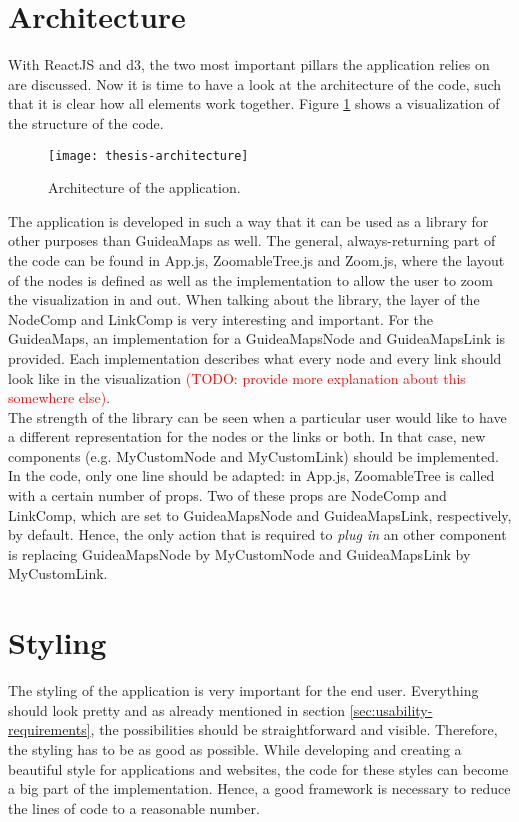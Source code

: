 \section{Architecture}\label{sec:architecture}
With ReactJS and d3, the two most important pillars the application relies on are discussed. Now it is time to have a look at the architecture of the code, such that it is clear how all elements work together. Figure \ref{fig:architecture} shows a visualization of the structure of the code.
\begin{figure}[H]
	\centering
	\texttt{[image: thesis-architecture]}
	\caption{Architecture of the application.}
	\label{fig:architecture}
\end{figure}

The application is developed in such a way that it can be used as a library for other purposes than GuideaMaps as well. The general, always-returning part of the code can be found in App.js, ZoomableTree.js and Zoom.js, where the layout of the nodes is defined as well as the implementation to allow the user to zoom the visualization in and out. When talking about the library, the layer of the NodeComp and LinkComp is very interesting and important. For the GuideaMaps, an implementation for a GuideaMapsNode and GuideaMapsLink is provided. Each implementation describes what every node and every link should look like in the visualization \textcolor{red}{(TODO: provide more explanation about this somewhere else)}.\\

The strength of the library can be seen when a particular user would like to have a different representation for the nodes or the links or both. In that case, new components (e.g. MyCustomNode and MyCustomLink) should be implemented. In the code, only one line should be adapted: in App.js, ZoomableTree is called with a certain number of props. Two of these props are NodeComp and LinkComp, which are set to GuideaMapsNode and GuideaMapsLink, respectively, by default. Hence, the only action that is required to \textit{plug in} an other component is replacing GuideaMapsNode by MyCustomNode and GuideaMapsLink by MyCustomLink.

\section{Styling}\label{sec:styling}
The styling of the application is very important for the end user. Everything should look pretty and as already mentioned in section \ref{sec:usability-requirements}, the possibilities should be straightforward and visible. Therefore, the styling has to be as good as possible. While developing and creating a beautiful style for applications and websites, the code for these styles can become a big part of the implementation. Hence, a good framework is necessary to reduce the lines of code to a reasonable number. \\

